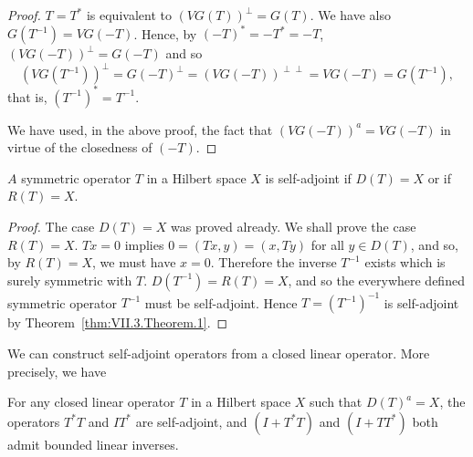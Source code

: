 \begin{proof}
 $T = T^{*}$ is equivalent to $(VG(T))^{\perp} = G(T)$. We have also $G(T^{-1}) = VG(-T)$. Hence, by $(-T)^{*} = -T^{*} = -T$, $(VG(-T))^{\perp} = G(-T)$ and so 
\[
(V G (T ^{-1})) ^{\perp} = G (- T) ^{\perp} = (V G (- T)) ^{\perp \perp} = V G (- T) = G (T ^{-1}),
\]
that is, $(T^{-1})^{*} = T^{-1}$. 


We have used, in the above proof, the fact that $(VG(-T))^a = VG(-T)$ in virtue of the closedness of $(-T)$. 
\end{proof}

\begin{corollaryu} $A$ symmetric operator $T$ in a Hilbert space $X$ is self-adjoint if $D(T) = X$ or if $R(T) = X$. 
\end{corollaryu}

\begin{proof}
 The case $D(T) = X$ was proved already. We shall prove the case $R(T) = X$. $Tx = 0$ implies $0 = (Tx, y) = (x, Ty)$ for all $y \in D(T)$, and so, by $R(T) = X$, we must have $x = 0$. Therefore the inverse $T^{-1}$ exists which is surely symmetric with $T$. $D(T^{-1}) = R(T) = X$, and so the everywhere defined symmetric operator $T^{-1}$ must be self-adjoint. Hence $T = (T^{-1})^{-1}$ is self-adjoint by Theorem~\ref{thm:VII.3.Theorem.1}. 
\end{proof}

We can construct self-adjoint operators from a closed linear operator. More precisely, we have 

\begin{theorem}\label{thm:VII.3.Theorem.2} For any closed linear operator $T$ in a Hilbert space $X$ such that $D(T)^{a} = X$, the operators $T^{*}T$ and $IT^{*}$ are self-adjoint, and $(I + T^{*}T)$ and $(I + TT^{*})$ both admit bounded linear inverses. 
\end{theorem}

